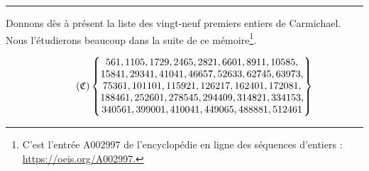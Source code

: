 \begin{adjustwidth}{1cm}{1cm}
	\begin{center}
		\vspace{0.5cm}
		\rule{11cm}{0.5pt}
		\vspace{1cm}

		Donnons dès à présent la liste des vingt-neuf premiers entiers de Carmichael. Nous l'étudierons beaucoup dans la suite de ce mémoire\footnote{C’est l'entrée A002997 de l'encyclopédie en ligne des séquences d’entiers : \url{https://oeis.org/A002997.}}.

		\begin{equation}\tag{$\mathfrak{C}$}\label{liste-carmichael}
			\begin{Bmatrix}
				561,1105,1729,2465,2821,6601,8911,10585, \\
				15841, 29341, 41041, 46657, 52633, 62745, 63973, \\
				75361, 101101, 115921, 126217, 162401, 172081, \\
				188461, 252601, 278545, 294409, 314821, 334153, \\
				340561, 399001, 410041, 449065, 488881, 512461
			\end{Bmatrix}
		\end{equation}
		\vspace{1em}
	\end{center}
\end{adjustwidth}

